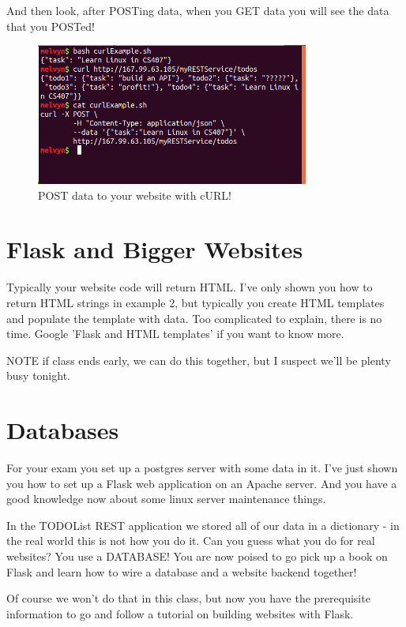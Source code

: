 \documentclass[10pt]{article}
\begin{document}
And then look, after POSTing data, when you GET data you will see the data that you POSTed!

\begin{figure}[h]
  \centering
    \includegraphics[width=0.8\textwidth]{addedToTODOList.png}
  \caption{POST data to your website with cURL!}
\end{figure}

\pagebreak

\section{Flask and Bigger Websites}
Typically your website code will return HTML. I've only shown you how to return HTML strings in example 2, but typically you create HTML templates and populate the template with data. Too complicated to explain, there is no time. Google 'Flask and HTML templates' if you want to know more.

NOTE if class ends early, we can do this together, but I suspect we'll be plenty busy tonight.

\section{Databases}
For your exam you set up a postgres server with some data in it. I've just shown you how to set up a Flask web application on an Apache server. And you have a good knowledge now about some linux server maintenance things. 

In the TODOList REST application we stored all of our data in a dictionary - in the real world this is not how you do it. Can you guess what you do for real websites? You use a DATABASE! You are now poised to go pick up a book on Flask and learn how to wire a database and a website backend together!

Of course we won't do that in this class, but now you have the prerequisite information to go and follow a tutorial on building websites with Flask.
\end{document}
